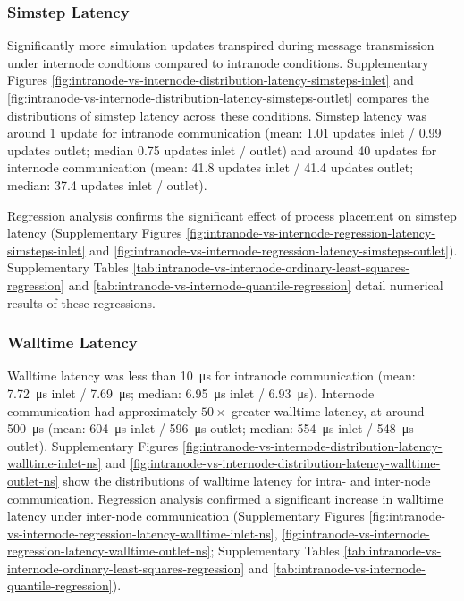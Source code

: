 \subsubsection{Simstep Latency}

Significantly more simulation updates transpired during message transmission under internode condtions compared to intranode conditions.
Supplementary Figures \ref{fig:intranode-vs-internode-distribution-latency-simsteps-inlet} and \ref{fig:intranode-vs-internode-distribution-latency-simsteps-outlet} compares the distributions of simstep latency across these conditions.
Simstep latency was around 1 update for intranode communication (mean: 1.01 updates inlet / 0.99 updates outlet; median 0.75 updates inlet / outlet) and around 40 updates for internode communication (mean: 41.8 updates inlet / 41.4 updates outlet; median: 37.4 updates inlet / outlet).

Regression analysis confirms the significant effect of process placement on simstep latency (Supplementary Figures \ref{fig:intranode-vs-internode-regression-latency-simsteps-inlet} and \ref{fig:intranode-vs-internode-regression-latency-simsteps-outlet}).
Supplementary Tables \ref{tab:intranode-vs-internode-ordinary-least-squares-regression} and \ref{tab:intranode-vs-internode-quantile-regression} detail numerical results of these regressions.

\subsubsection{Walltime Latency}

Walltime latency was less than \SI{10}{\micro\second} for intranode communication (mean: \SI{7.72}{\micro\second} inlet / \SI{7.69}{\micro\second}; median: \SI{6.95}{\micro\second} inlet / \SI{6.93}{\micro\second}).
Internode communication had approximately $50\times$ greater walltime latency, at around \SI{500}{\micro\second} (mean: \SI{604}{\micro\second} inlet / \SI{596}{\micro\second} outlet; median: \SI{554}{\micro\second} inlet / \SI{548}{\micro\second} outlet).
Supplementary Figures \ref{fig:intranode-vs-internode-distribution-latency-walltime-inlet-ns} and \ref{fig:intranode-vs-internode-distribution-latency-walltime-outlet-ns} show the distributions of walltime latency for intra- and inter-node communication.
Regression analysis confirmed a significant increase in walltime latency under inter-node communication (Supplementary Figures \ref{fig:intranode-vs-internode-regression-latency-walltime-inlet-ns}, \ref{fig:intranode-vs-internode-regression-latency-walltime-outlet-ns}; Supplementary Tables \ref{tab:intranode-vs-internode-ordinary-least-squares-regression} and \ref{tab:intranode-vs-internode-quantile-regression}).

